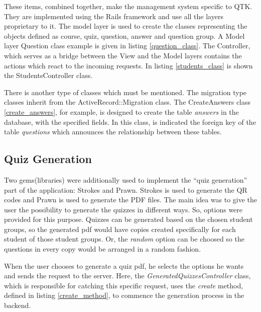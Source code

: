 These items, combined together, make the management system specific to QTK. They are implemented using the Rails framework and use all the layers proprietary to it. The model layer is used to create the classes representing the objects defined as course, quiz, question, answer and question group. A Model layer Question class example is given in listing \ref{question_class}.
The Controller, which serves as a bridge between the View and the Model layers contains the actions which react to the incoming requests. In listing \ref{students_class} is shown the StudentsController class. 





There is another type of classes which must be mentioned. The migration type classes inherit from the ActiveRecord::Migration class. The CreateAnswers class \ref{create_answers}, for example, is designed to create the table \textit{answers} in the database, with the specified fields. In this class, is indicated the foreign key of the table \textit{questions} which announces the relationship between these tables.





\subsection{Quiz Generation}
Two gems(libraries) were additionally used to implement the ``quiz generation'' part of the application: Strokes and Prawn. Strokes is used to generate the QR codes and Prawn is used to generate the PDF files. The main idea was to give the user the possibility to generate the quizzes in different ways. So, options were provided for this purpose. Quizzes can be generated based on the chosen student groups, so the generated pdf would have copies created specifically for each student of those student groups. Or, the \textit{random} option can be choosed so the questions in every copy would be arranged in a random fashion.

When the user chooses to generate a quiz pdf, he selects the options he wants and sends the request to the server. Here, the \textit{GeneratedQuizzesController} class, which is responsible for catching this specific request, uses the \textit{create} method, defined in listing \ref{create_method}, to commence the generation process in the backend. 

